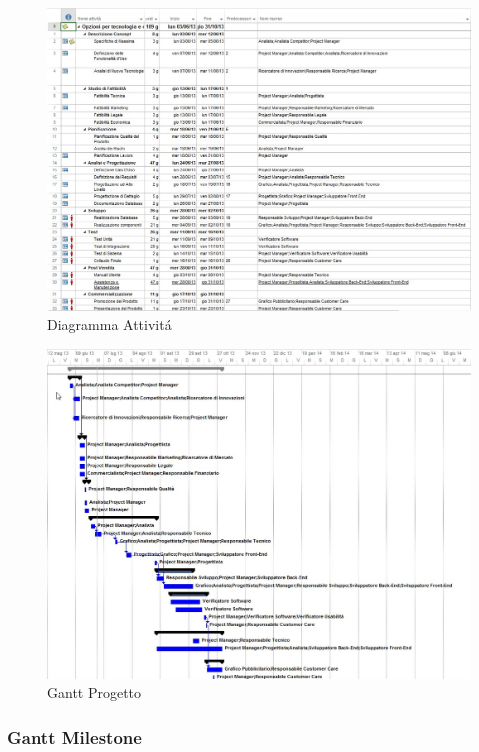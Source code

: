 \begin{figure}[H]
\begin{center}
\includegraphics[width=1\textwidth]{img/Attivita.jpg}
\caption{Diagramma  Attivit\'a}
\label{fig:Diagramma Attivit\'a}
\end{center}
\end{figure}
\begin{figure}[H]
\begin{center}
\includegraphics[width=1\textwidth]{img/Gantt.jpg}
\caption{Gantt Progetto}
\label{fig:Gantt Progetto}
\end{center}
\end{figure}
\newpage
\subsubsection{Gantt Milestone}

